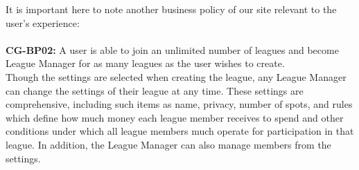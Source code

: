 It is important here to note another business policy of our site relevant to the user's experience: \\ \\
\textbf{CG-BP02:} A user is able to join an unlimited number of leagues and become League Manager for as many leagues as the user wishes to create. \\

Though the settings are selected when creating the league, any League Manager can change the settings of their league at any time. These settings are comprehensive, including such items as name, privacy, number of spots, and rules which define how much money each league member receives to spend and other conditions under which all league members much operate for participation in that league. In addition, the League Manager can also manage members from the settings.\\

